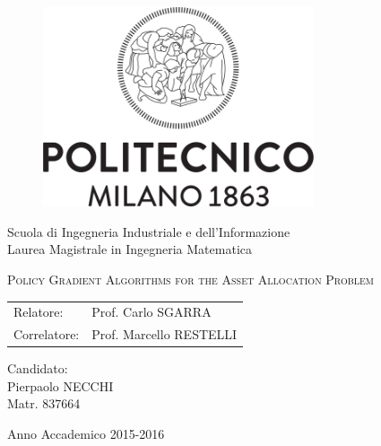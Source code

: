 \begin{titlepage}

	\begin{figure}[htpb]
		\centering
		\includegraphics[width=8cm]{Cover/polimi_name_bn}
	\end{figure}

	\begin{center}
	\vspace{1cm}
		\normalsize 
			Scuola di Ingegneria Industriale e dell'Informazione\\
      		Laurea Magistrale in Ingegneria Matematica\\
  	\vspace{1cm}
	\end{center}
	
	\begin{center}
		\LARGE
			\textsc{Policy Gradient Algorithms for the Asset Allocation Problem}
		\vspace{1.5cm}
	\end{center}

	\begin{flushleft}
		\large
		\begin{tabular}{ll}
		Relatore:    & Prof. Carlo SGARRA      \\
		Correlatore: & Prof. Marcello RESTELLI
		\end{tabular}
		\vspace{0.5cm}
	\end{flushleft}
	
	\begin{flushright}
		\large
		Candidato:\\
		Pierpaolo NECCHI\\
		Matr. 837664\\		
	\end{flushright}
	
	\vspace*{\fill}
	\begin{center}
		Anno Accademico 2015-2016
	\end{center}
	
\end{titlepage}
